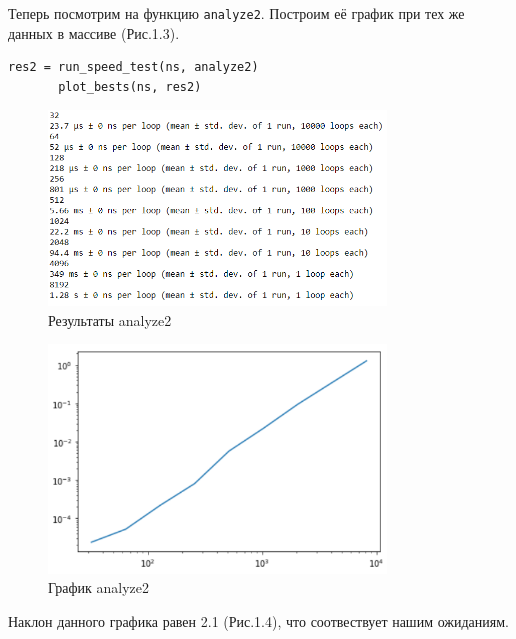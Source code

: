 \documentclass[a4paper,12pt]{report}
\begin{document}
    Теперь посмотрим на функцию \texttt{analyze2}. Построим её график при тех же данных в массиве (Рис.1.3).
\begin{lstlisting}[caption=Получение результатов для analyze2]
       res2 = run_speed_test(ns, analyze2)
       plot_bests(ns, res2)
\end{lstlisting}
\begin{figure}[H]
        \centering
        \includegraphics[width=0.8\textwidth]{fig1-3.PNG}
        \caption{Результаты analyze2}
        \label{fig:fig1-3}
\end{figure}  
\begin{figure}[H]
        \centering
        \includegraphics[width=0.8\textwidth]{fig1-4.PNG}
        \caption{График analyze2}
        \label{fig:fig1-4}
\end{figure} 

    Наклон данного графика равен 2.1 (Рис.1.4), что соотвествует нашим ожиданиям.  
    
\end{document}
